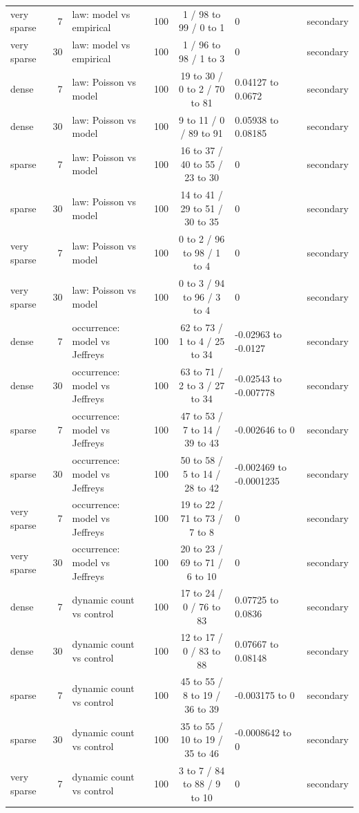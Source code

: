 \begin{table}[p]
\begin{tabular}{lrllcll}
very sparse & 7 & law: model vs empirical & 100 & 1 / 98 to 99 / 0 to 1 & 0 & secondary \\
very sparse & 30 & law: model vs empirical & 100 & 1 / 96 to 98 / 1 to 3 & 0 & secondary \\
dense & 7 & law: Poisson vs model & 100 & 19 to 30 / 0 to 2 / 70 to 81 & 0.04127 to 0.0672 & secondary \\
dense & 30 & law: Poisson vs model & 100 & 9 to 11 / 0 / 89 to 91 & 0.05938 to 0.08185 & secondary \\
sparse & 7 & law: Poisson vs model & 100 & 16 to 37 / 40 to 55 / 23 to 30 & 0 & secondary \\
sparse & 30 & law: Poisson vs model & 100 & 14 to 41 / 29 to 51 / 30 to 35 & 0 & secondary \\
very sparse & 7 & law: Poisson vs model & 100 & 0 to 2 / 96 to 98 / 1 to 4 & 0 & secondary \\
very sparse & 30 & law: Poisson vs model & 100 & 0 to 3 / 94 to 96 / 3 to 4 & 0 & secondary \\
dense & 7 & occurrence: model vs Jeffreys & 100 & 62 to 73 / 1 to 4 / 25 to 34 & -0.02963 to -0.0127 & secondary \\
dense & 30 & occurrence: model vs Jeffreys & 100 & 63 to 71 / 2 to 3 / 27 to 34 & -0.02543 to -0.007778 & secondary \\
sparse & 7 & occurrence: model vs Jeffreys & 100 & 47 to 53 / 7 to 14 / 39 to 43 & -0.002646 to 0 & secondary \\
sparse & 30 & occurrence: model vs Jeffreys & 100 & 50 to 58 / 5 to 14 / 28 to 42 & -0.002469 to -0.0001235 & secondary \\
very sparse & 7 & occurrence: model vs Jeffreys & 100 & 19 to 22 / 71 to 73 / 7 to 8 & 0 & secondary \\
very sparse & 30 & occurrence: model vs Jeffreys & 100 & 20 to 23 / 69 to 71 / 6 to 10 & 0 & secondary \\
dense & 7 & dynamic count vs control & 100 & 17 to 24 / 0 / 76 to 83 & 0.07725 to 0.0836 & secondary \\
dense & 30 & dynamic count vs control & 100 & 12 to 17 / 0 / 83 to 88 & 0.07667 to 0.08148 & secondary \\
sparse & 7 & dynamic count vs control & 100 & 45 to 55 / 8 to 19 / 36 to 39 & -0.003175 to 0 & secondary \\
sparse & 30 & dynamic count vs control & 100 & 35 to 55 / 10 to 19 / 35 to 46 & -0.0008642 to 0 & secondary \\
very sparse & 7 & dynamic count vs control & 100 & 3 to 7 / 84 to 88 / 9 to 10 & 0 & secondary \\

\end{tabular}
\end{table}

